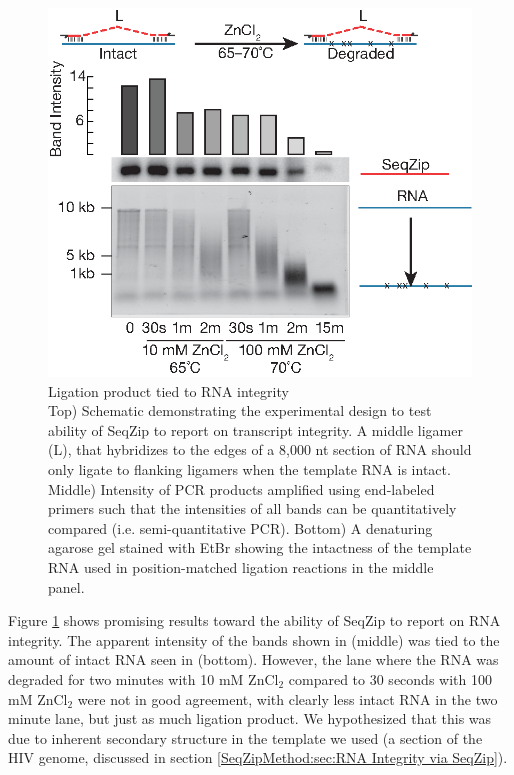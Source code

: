 	  \begin{figure} %
    	\centering 
    	\includegraphics{Figures/SeqZipMethod/DegreadedRNABySeqZip.eps}
    	\caption[Ligation product tied to RNA integrity]
    	{
		    Ligation product tied to RNA integrity\\[0.25cm]
      	Top) Schematic demonstrating the experimental design to test ability of SeqZip to report on transcript integrity. A middle ligamer (L), that hybridizes to the edges of a 8,000 nt section of RNA should only ligate to flanking ligamers when the template RNA is intact. \\
        Middle) Intensity of PCR products amplified using end-labeled primers such that the intensities of all bands can be quantitatively compared (i.e. semi-quantitative PCR). Bottom) A denaturing agarose gel stained with EtBr showing the intactness of the template RNA used in position-matched ligation reactions in the middle panel.
    		}
    	\label{SeqZipMethod:fig:Ligation product and RNA integrity}
  		\end{figure}

    Figure \ref{SeqZipMethod:fig:Ligation product and RNA integrity} shows promising results toward the ability of SeqZip to report on RNA integrity. The apparent intensity of the bands shown in (middle) was tied to the amount of intact RNA seen in (bottom). However, the lane where the RNA was degraded for two minutes with 10 mM ZnCl$_{2}$ compared to 30 seconds with 100 mM ZnCl$_{2}$ were not in good agreement, with clearly less intact RNA in the two minute lane, but just as much ligation product. We hypothesized that this was due to inherent secondary structure in the template we used (a section of the HIV genome, discussed in section \ref{SeqZipMethod:sec:RNA Integrity via SeqZip}). 


